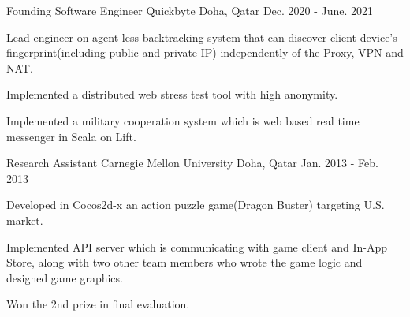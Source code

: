 \begin{cventries}
  \cventry
    {Founding Software Engineer} %
    {Quickbyte} %
    {Doha, Qatar} %
    {Dec. 2020 - June. 2021} %
    {
      \begin{cvitems} %
        \item {Lead engineer on agent-less backtracking system that can discover client device's fingerprint(including public and private IP) independently of the Proxy, VPN and NAT.}
        \item {Implemented a distributed web stress test tool with high anonymity.}
        \item {Implemented a military cooperation system which is web based real time messenger in Scala on Lift.}
      \end{cvitems}
    }

  \cventry
    {Research Assistant} %
    {Carnegie Mellon University} %
    {Doha, Qatar} %
    {Jan. 2013 - Feb. 2013} %
    {
      \begin{cvitems} %
        \item {Developed in Cocos2d-x an action puzzle game(Dragon Buster) targeting U.S. market.}
        \item {Implemented API server which is communicating with game client and In-App Store, along with two other team members who wrote the game logic and designed game graphics.}
        \item {Won the 2nd prize in final evaluation.}
      \end{cvitems}
    }

\end{cventries}
